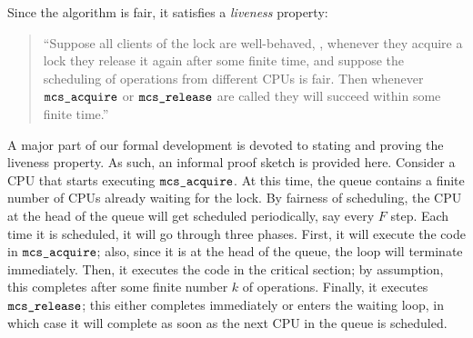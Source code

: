 Since the algorithm is fair, it satisfies a \textit{liveness} property:\begin{quote}
``Suppose all clients of the lock are well-behaved, \ie, whenever they acquire a lock they release it again after some finite time, and suppose the scheduling of operations from different CPUs is fair. Then  whenever ${\mathrm{\texttt{mcs\_acquire}}}$ or ${\mathrm{\texttt{mcs\_release}}}$ are called they will succeed within some finite time.''
\end{quote}
A major part of our formal development is devoted to stating and proving the liveness property. 
As such, an informal proof sketch is provided here. Consider a CPU that starts executing 
 ${\mathrm{\texttt{mcs\_acquire}}}$.
At this time, the queue contains a finite number of CPUs already waiting for the lock.
By fairness of scheduling, the CPU at the head of the queue will get scheduled periodically, say every $F$ step. Each time it is scheduled, it will go through three phases. 
First, it will execute the code in ${\mathrm{\texttt{mcs\_acquire}}}$; also, since it is at the head of the queue, the loop will terminate immediately. 
Then, it executes the code in the critical section; 
by assumption, this completes after some finite number $k$ of operations. 
Finally, it executes ${\mathrm{\texttt{mcs\_release}}}$; this either completes immediately or enters the waiting loop, in which case it will complete as soon as the next CPU in the queue is scheduled.



